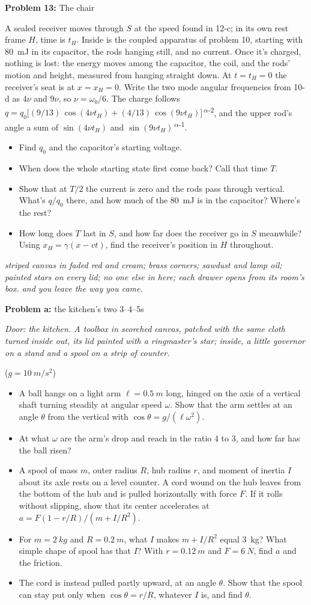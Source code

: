 \documentclass[11pt]{article}
\newcommand{\scene}[1]{\par{\itshape #1}\par}
\newcommand{\problem}[2]{\par\medskip\textbf{Problem #1:} #2\par\nopagebreak}
\newcommand{\appx}[2]{\clearpage{\Large\bfseries Appendix #1: #2}\par\medskip}
\newenvironment{parts}{\begin{itemize}[leftmargin=3.4em,labelwidth=2.8em,labelsep=0.6em,align=left,itemsep=3pt,topsep=4pt]}{\end{itemize}}
\newcommand{\pt}[1]{\item[\textbf{#1}]}
\newcommand{\sv}[1]{\textsuperscript{\dag\,#1}}
\begin{document}
\problem{13}{The chair}
A sealed receiver moves through $S$ at the speed found in 12-c; in its own rest frame $H$, time is $t_H$. Inside is the coupled apparatus of problem 10, starting with \SI{80}{mJ} in its capacitor, the rods hanging still, and no current. Once it's charged, nothing is lost: the energy moves among the capacitor, the coil, and the rods' motion and height, measured from hanging straight down. At $t = t_H = 0$ the receiver's seat is at $x = x_H = 0$. Write the two mode angular frequencies from 10-d as $4\nu$ and $9\nu$, so $\nu = \omega_0/6$. The charge follows $q = q_0\bigl[(9/13)\,\cos(4\nu t_H) + (4/13)\,\cos(9\nu t_H)\bigr]$\sv{$\alpha$-2}, and the upper rod's angle a sum of $\sin(4\nu t_H)$ and $\sin(9\nu t_H)$\sv{$\alpha$-1}.
\begin{parts}
\pt{13-a} Find $q_0$ and the capacitor's starting voltage.
\pt{13-b} When does the whole starting state first come back? Call that time $T$.
\pt{13-c} Show that at $T/2$ the current is zero and the rods pass through vertical. What's $q/q_0$ there, and how much of the \SI{80}{mJ} is in the capacitor? Where's the rest?
\pt{13-d} How long does $T$ last in $S$, and how far does the receiver go in $S$ meanwhile? Using $x_H = \gamma(x - vt)$, find the receiver's position in $H$ throughout.
\end{parts}

\appx{a}{the cabinet}
\scene{striped canvas in faded red and cream; brass corners; sawdust and lamp oil; painted stars on every lid; no one else in here; each drawer opens from its room's box. and you leave the way you came.}

\problem{a}{the kitchen's two 3--4--5s}
\scene{Door: the kitchen. A toolbox in scorched canvas, patched with the same cloth turned inside out, its lid painted with a ringmaster's star; inside, a little governor on a stand and a spool on a strip of counter.}
($g = \SI{10}{m/s^2}$)
\begin{parts}
\pt{a-1} A ball hangs on a light arm $\ell = \SI{0.5}{m}$ long, hinged on the axis of a vertical shaft turning steadily at angular speed $\omega$. Show that the arm settles at an angle $\theta$ from the vertical with $\cos\theta = g/(\ell\omega^2)$.
\pt{a-2} At what $\omega$ are the arm's drop and reach in the ratio 4 to 3, and how far has the ball risen?
\pt{a-3} A spool of mass $m$, outer radius $R$, hub radius $r$, and moment of inertia $I$ about its axle rests on a level counter. A cord wound on the hub leaves from the bottom of the hub and is pulled horizontally with force $F$. If it rolls without slipping, show that its center accelerates at $a = F(1 - r/R)/(m + I/R^2)$.
\pt{a-4} For $m = \SI{2}{kg}$ and $R = \SI{0.2}{m}$, what $I$ makes $m + I/R^2$ equal \SI{3}{kg}? What simple shape of spool has that $I$? With $r = \SI{0.12}{m}$ and $F = \SI{6}{N}$, find $a$ and the friction.
\pt{a-5} The cord is instead pulled partly upward, at an angle $\theta$. Show that the spool can stay put only when $\cos\theta = r/R$, whatever $I$ is, and find $\theta$.
\end{parts}
\end{document}
